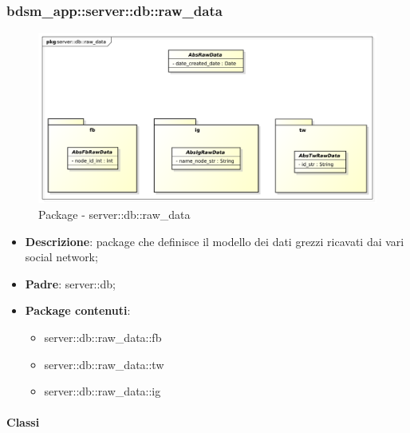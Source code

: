 \subsubsection{bdsm\_app::server::db::raw\_data} %
\label{ssub:bdsm_app_server_raw_model}
	\begin{figure}[htbp]
		\centering
		\centerline{\includegraphics[scale=0.35]{./images/server/raw_data.pdf}}
		\caption{Package - server::db::raw\_data}
	\end{figure}

	\begin{itemize}
	\item \textbf{Descrizione}: package che definisce il modello dei dati grezzi ricavati dai vari social network;
		\item \textbf{Padre}: server::db;
		\item \textbf{Package contenuti}:
			\begin{itemize}
				\item server::db::raw\_data::fb
				\item server::db::raw\_data::tw
				\item server::db::raw\_data::ig
		\end{itemize}
	\end{itemize}


	\paragraph{Classi} %

